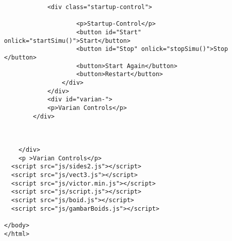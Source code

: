 \begin{lstlisting}
			<div class="startup-control">
				
					<p>Startup-Control</p>
					<button id="Start" onlick="startSimu()">Start</button>
					<button id="Stop" onlick="stopSimu()">Stop </button>
					<button>Start Again</button>
					<button>Restart</button>
				</div>
			</div>
			<div id="varian-">
			<p>Varian Controls</p>
		</div>



	</div>
	<p >Varian Controls</p>
  <script src="js/sides2.js"></script>
  <script src="js/vect3.js"></script>
  <script src="js/victor.min.js"></script>
  <script src="js/script.js"></script>
  <script src="js/boid.js"></script>
  <script src="js/gambarBoids.js"></script>
  
</body>
</html>

\end{lstlisting}
